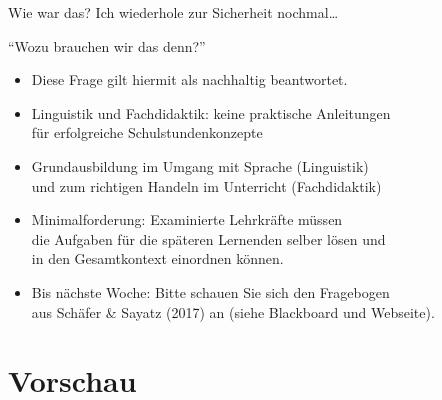 \begin{frame}
  {Wie war das?}
  Ich wiederhole zur Sicherheit nochmal\ldots\\
  \vspace{\baselineskip}
  \pause
  \begin{center}
    \Large{}
  \end{center}
\end{frame}

\begin{frame}
  {"`Wozu brauchen wir das denn?"'}
  \pause
  \begin{itemize}[<+->]
    \item Diese Frage gilt hiermit als nachhaltig beantwortet.
    \item Linguistik und Fachdidaktik: keine praktische Anleitungen\\
      für erfolgreiche Schulstundenkonzepte
    \item Grundausbildung im \alert{Umgang mit Sprache} (Linguistik)\\
      und zum \alert{richtigen Handeln im Unterricht} (Fachdidaktik)
      \vspace{\baselineskip}
    \item Minimalforderung: \alert{Examinierte Lehrkräfte müssen\\
      die Aufgaben für die späteren Lernenden selber lösen und\\
      in den Gesamtkontext einordnen können.}
    \item \alert{Bis nächste Woche: Bitte schauen Sie sich den Fragebogen\\
      aus Schäfer \& Sayatz (2017) an (siehe Blackboard und Webseite).}
  \end{itemize}
\end{frame}

\section{Vorschau}

